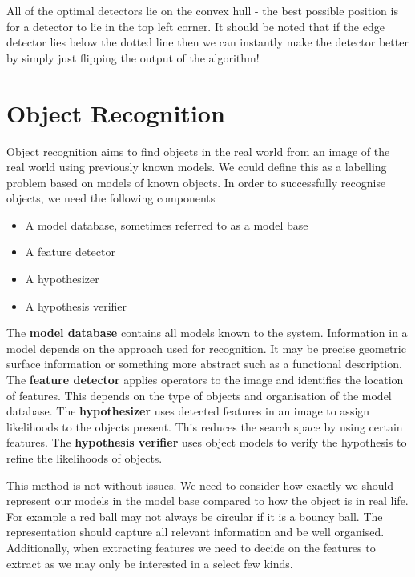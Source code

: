 \documentclass{article}
\begin{document}
	All of the optimal detectors lie on the convex hull - the best possible position is for a detector to lie in the top left corner. It should be noted that if the edge detector lies below the dotted line then we can instantly make the detector better by simply just flipping the output of the algorithm!
		
	\section{Object Recognition}
	Object recognition aims to find objects in the real world from an image of the real world using previously known models. We could define this as a labelling problem based on models of known objects. In order to successfully recognise objects, we need the following components
	\begin{itemize}
		\item A model database, sometimes referred to as a model base
		\item A feature detector
		\item A hypothesizer
		\item A hypothesis verifier
	\end{itemize}

	The \textbf{model database} contains all models known to the system. Information in a model depends on the approach used for recognition. It may be precise geometric surface information or something more abstract such as a functional description. The \textbf{feature detector} applies operators to the image and identifies the location of features. This depends on the type of objects and organisation of the model database. The \textbf{hypothesizer} uses detected features in an image to assign likelihoods to the objects present. This reduces the search space by using certain features. The \textbf{hypothesis verifier} uses object models to verify the hypothesis to refine the likelihoods of objects.
	
	\par 
	This method is not without issues. We need to consider how exactly we should represent our models in the model base compared to how the object is in real life. For example a red ball may not always be circular if it is a bouncy ball. The representation should capture all relevant information and be well organised. Additionally, when extracting features we need to decide on the features to extract as we may only be interested in a select few kinds.
	
\end{document}
